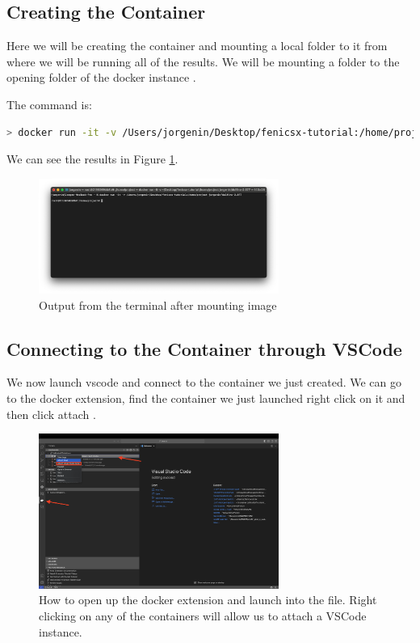 \documentclass[final]{article}
\numberwithin{equation}{section}
\theoremstyle{remarkStyle}
\begin{document}
\subsection{Creating the Container}
Here we will be creating the container and mounting a local folder to it from where we will be running all of the results.
We will be mounting a folder  to the opening folder of the docker instance .

The command is:
\begin{lstlisting}[language=bash, caption=Docker Pull Command]
> docker run -it -v /Users/jorgenin/Desktop/fenicsx-tutorial:/home/project jorgenin/dolfinx-2.077:v0.8
\end{lstlisting}

We can see the results in Figure \ref{fig:Terminal_mount_image}.
\begin{figure}[H]
  \centering
  \includegraphics[width=0.7\textwidth]{Container-Monted-Folder.png}
  \caption{Output from the terminal after mounting image}%
  \label{fig:Terminal_mount_image}%
\end{figure}

\subsection{Connecting to the Container through VSCode}

We now launch vscode and connect to the container we just created.
We can go to the docker extension, find the container we just launched right click on it and then click attach .
\begin{figure}[H]
  \centering
  \includegraphics[width=0.7\textwidth]{VsCode-Docker.png}
  \caption{How to open up the docker extension and launch into the file. Right clicking on any of the containers will allow us to attach a VSCode instance. }%
  \label{fig:vsDocker}%
\end{figure}
\end{document}
